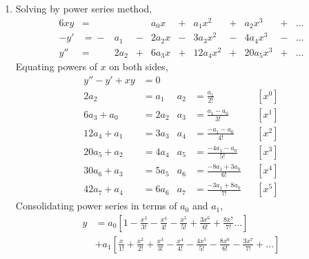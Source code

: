 \begin{enumerate}
    \item Solving by power series method,
          \begin{alignat}{6}
              xy    & ={}       &       & {}        & a_0 x  &
              {}+{} & a_1 x^2   & {}+{} & a_2x^3    & {}+{}  & \dots \\
              -y'   & ={}-{}    & a_1   & {}-{}     & 2a_2 x &
              {}-{} & 3a_3 x^2  & {}-{} & 4a_4 x^3  & {}-{}  & \dots \\
              y''   & ={}       & 2a_2  & {}+{}     & 6a_3 x &
              {}+{} & 12a_4 x^2 & {}+{} & 20a_5 x^3 & {}+{}  & \dots
          \end{alignat}
          Equating powers of $ x $ on both sides, \\
          \begin{align}
              y'' - y' + xy & = 0                                   \\
              2a_2          & = a_1                     &
              a_2           & = \frac{a_1}{2!}          &   & [x^0] \\
              6a_3 + a_0    & = 2a_2                    &
              a_3           & = \frac{a_1 - a_0}{3!}    &   & [x^1] \\
              12a_4 + a_1   & = 3a_3                    &
              a_4           & = \frac{-a_1 - a_0}{4!}   &   & [x^2] \\
              20a_5 + a_2   & = 4a_4                    &
              a_5           & = \frac{-4a_1 - a_0}{5!}  &   & [x^3] \\
              30a_6 + a_3   & = 5a_5                    &
              a_6           & = \frac{-8a_1 + 3a_0}{6!} &   & [x^4] \\
              42a_7 + a_4   & = 6a_6                    &
              a_7           & = \frac{-3a_1 + 8a_0}{7!} &   & [x^5]
          \end{align}
          Consolidating power series in terms of $ a_0 $ and $ a_1 $,
          \begin{align}
              y & = a_0\left[ 1 - \frac{x^3}{3!} - \frac{x^4}{4!}
              - \frac{x^5}{5!} + \frac{3x^6}{6!} + \frac{8x^7}{7!} \dots \right] \\
                & + a_1 \left[ \frac{x}{1!} + \frac{x^2}{2!}
                  + \frac{x^3}{3!} - \frac{x^4}{4!} - \frac{4x^5}{5!}
                  - \frac{8x^6}{6!} - \frac{3x^7}{7!} + \dots \right]
          \end{align}


\end{enumerate}

